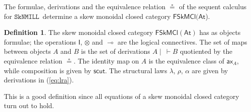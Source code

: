 \documentclass[copyright,creativecommons]{eptcs}
\theoremstyle{definition}
\newtheorem{defn}{Definition}[section]
\newcommand{\ax}{\mathsf{ax}}
\newcommand{\ot}{\otimes}
\newcommand{\lolli}{\multimap}
\newcommand{\I}{\mathsf{I}}
\newcommand{\SkNMILL}{$\mathtt{SkNMILL}$}
\newcommand{\FSkMCC}{\mathsf{FSkMCl}}
\begin{document}
The formulae, derivations and the equivalence relation $\circeq$ of the sequent calculus for \SkNMILL\ determine a skew monoidal closed category $\FSkMCC(\mathsf{At}$).
\begin{defn}\label{def:fskmcc}
  The skew monoidal closed category $\FSkMCC(\mathsf{At})$ has
  as objects formulae; the operations $\I$, $\ot$ and $\lolli$ are the logical connectives. The set of maps between objects $A$ and $B$ is the set of derivations $A \mid ~ \vdash B$ quotiented by the equivalence relation $\circeq$. The identity map on $A$ is the equivalence class of $\ax_A$, while composition is given by $\mathsf{scut}$. The structural laws $\lambda$, $\rho$, $\alpha$ are given by derivations in (\ref{eq:lra}). 
\end{defn}
 This is a good definition since all equations of a skew monoidal closed category turn out to hold.
\end{document}
